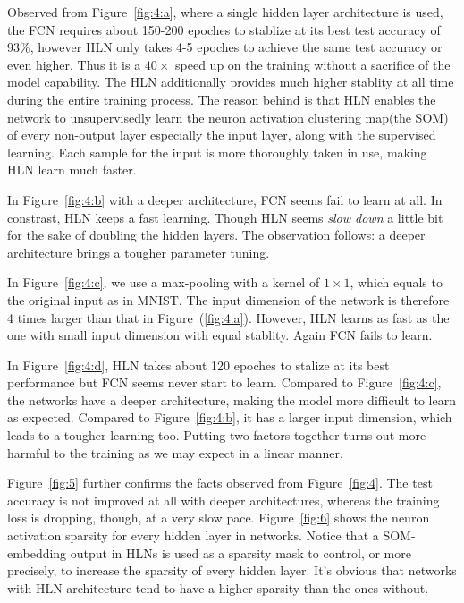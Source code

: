 \documentclass[3p,times,procedia]{elsarticle}
\begin{document}
Observed from Figure~\ref{fig:4:a}, 
where a single hidden layer 
architecture is used,
the FCN requires about 
150-200 epoches to stablize 
at its best test accuracy of 
93\%, however HLN
only takes 4-5 epoches to achieve 
the same test 
accuracy or even higher. 
Thus it is a $40\times$ speed up 
on the training without a sacrifice 
of the
model capability. 
The HLN additionally provides
much higher stablity at all time 
during the entire
training process. 
The reason behind is that
HLN enables 
the network to unsupervisedly
learn the neuron activation 
clustering map(the SOM) of 
every non-output layer
especially the input layer,
along with
the supervised learning. 
Each sample for the input
is more thoroughly taken in use, 
making HLN learn much faster.

In Figure~\ref{fig:4:b} with 
a deeper architecture,
FCN seems fail to learn at all.
In constrast, HLN keeps a fast 
learning. Though HLN seems 
\emph{slow down} a little bit for
the sake of doubling the hidden layers.
The observation follows: a deeper
architecture brings a tougher 
parameter tuning.

In Figure~\ref{fig:4:c}, 
we use a max-pooling with a kernel 
of $1\times 1$,
which equals to the original input as 
in MNIST.
The input dimension of the network
is therefore 4 
times larger than that in 
Figure~(\ref{fig:4:a}).
However,
HLN learns as fast as the one 
with small input
dimension with equal stablity.
Again FCN fails to learn.

In Figure~\ref{fig:4:d}, 
HLN takes about 120
epoches to stalize at its 
best performance but
FCN seems never start to learn.
Compared to Figure~\ref{fig:4:c}, 
the networks have a
deeper architecture, 
making the model more difficult
to learn as expected.  
Compared to Figure~\ref{fig:4:b},
it has a larger input dimension, 
which leads to a
tougher learning too. 
Putting two factors together
turns out more harmful to
the training as we may expect 
in a linear manner.

Figure~\ref{fig:5} further confirms 
the facts
observed from Figure~\ref{fig:4}.
The test accuracy is not improved at all
with deeper architectures,
whereas the training loss is dropping, 
though, at a very slow pace. 
Figure~\ref{fig:6} shows the neuron 
activation sparsity for every hidden 
layer in networks.
Notice that a SOM-embedding output 
in HLNs is used as a sparsity mask 
to control, or more
precisely, to increase the sparsity 
of every hidden layer. 
It's obvious that networks with 
HLN architecture tend to have a higher 
sparsity than the ones without.
\end{document}
